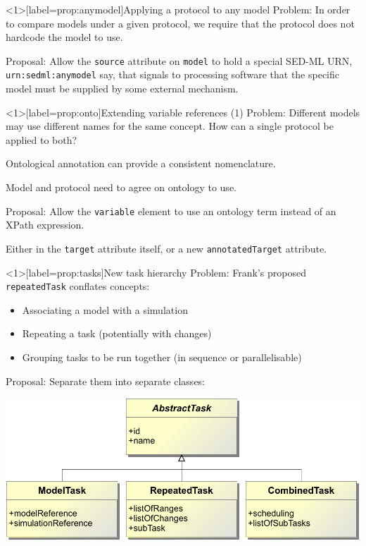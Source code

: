 \documentclass[t,xcolor={usenames,dvipsnames}]{beamer}
\newcommand{\sedml}[1]{\lstinline[basicstyle=\color{blue}]!#1!}
\begin{document}
\begin{frame}<1>[label=prop:anymodel]{Applying a protocol to any model}
\alert{Problem}:
 In order to compare models under a given protocol, we require that
 the protocol does not hardcode the model to use.

\alert{Proposal}:
 Allow the \sedml{source} attribute on \sedml{model} to hold a special
 SED-ML URN, \sedml{urn:sedml:anymodel} say, that signals to
 processing software that the specific model must be supplied by some
 external mechanism.
\end{frame}


\begin{frame}<1>[label=prop:onto]{Extending variable references (1)}
\alert{Problem}:
 Different models may use different names for the same concept.  How
 can a single protocol be applied to both?

 \alert{Ontological annotation} can provide a consistent nomenclature.

 Model and protocol need to agree on ontology to use.

\alert{Proposal}:
 Allow the \sedml{variable} element to use an ontology term instead of
 an XPath expression.

 Either in the \sedml{target} attribute itself, or a new
 \sedml{annotatedTarget} attribute.
\end{frame}


\begin{frame}<1>[label=prop:tasks]{New task hierarchy}
\alert{Problem}:
 Frank's proposed \sedml{repeatedTask} conflates concepts:
\begin{itemize}
\item Associating a model with a simulation
\item Repeating a task (potentially with changes)
\item Grouping tasks to be run together (in sequence or parallelisable)
\end{itemize}

\alert{Proposal}:
 Separate them into separate classes:
\begin{center}
\includegraphics[width=\textwidth]{task_uml}
\end{center}
\end{frame}
\end{document}

